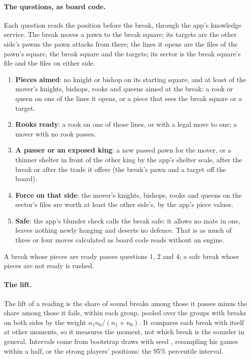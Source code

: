 \documentclass[11pt]{article}
\begin{document}
\paragraph{The questions, as board code.} Each question reads the position before the break,
through the app's knowledge service. The break moves a pawn to the break square; its targets are
the other side's pawns the pawn attacks from there; the lines it opens are the files of the
pawn's square, the break square and the targets; its sector is the break square's file and the
files on either side.
\begin{enumerate}[nosep]
\item \textbf{Pieces aimed}: no knight or bishop on its starting square, and at least \AimedMin{}
  of the mover's knights, bishops, rooks and queens aimed at the break: a rook or queen on one of
  the lines it opens, or a piece that sees the break square or a target.
\item \textbf{Rooks ready}: a rook on one of those lines, or with a legal move to one; a mover
  with no rook passes.
\item \textbf{A passer or an exposed king}: a new passed pawn for the mover, or a thinner shelter
  in front of the other king by the app's shelter scale, after the break or after the trade it
  offers (the break's pawn and a target off the board).
\item \textbf{Force on that side}: the mover's knights, bishops, rooks and queens on the sector's
  files are worth at least the other side's, by the app's piece values.
\item \textbf{Safe}: the app's blunder check calls the break safe: it allows no mate in one,
  leaves nothing newly hanging and deserts no defence. That is as much of three or four moves
  calculated as board code reads without an engine.
\end{enumerate}
A break whose pieces are ready passes questions 1, 2 and 4; a safe break whose pieces are not
ready is rushed.

\paragraph{The lift.} The lift of a reading is the share of sound breaks among those it passes
minus the share among those it fails, within each group, pooled over the groups with breaks on
both sides by the weight $n_1 n_0/(n_1+n_0)$. It compares each break with itself at other
moments, so it measures the moment, not which break is the sounder in general. Intervals come
from \Draws{} bootstrap draws with seed \Seed, resampling his games within a half, or the strong
players' positions: the 95\% percentile interval.
\end{document}
